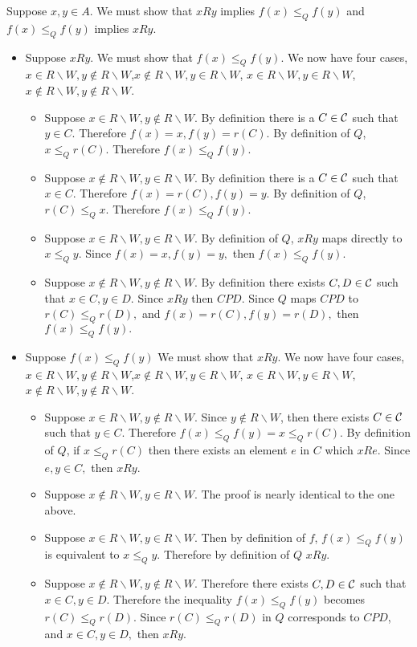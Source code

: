\documentclass[12pt, letterpaper]{article}
\begin{document}
\begin{itemize}
Suppose $x,y \in A.$  We must show that $xRy$ implies $f(x) \leq_Q f(y)$ and $f(x) \leq_Q f(y)$ implies $xRy.$
  \begin{itemize}
  	\item Suppose $xRy$. We must show that $f(x) \leq_Q f(y).$  We now have four cases, $x \in R \backslash W, y \not\in R \backslash W$,$x \not\in R \backslash W, y \in R \backslash W$, $x \in R \backslash W, y \in R \backslash W$, $x \not\in R \backslash W, y \not\in R \backslash W$.
  	\begin{itemize}
  		\item Suppose $x \in R \backslash W, y \not\in R \backslash W$.  By definition there is a $C \in \cal C$ such that $y \in C.$  Therefore $f(x) = x, f(y) = r(C).$  By definition of $Q$, $x \leq_Q r(C).$  Therefore $f(x) \leq_Q f(y).$
  		\item Suppose $x \not\in R \backslash W, y \in R \backslash W$.  By definition there is a $C \in \cal C$ such that $x \in C.$  Therefore $f(x) = r(C), f(y) = y.$  By definition of $Q$, $r(C) \leq_Q x.$  Therefore $f(x) \leq_Q f(y).$
  		\item Suppose $x \in R \backslash W, y \in R \backslash W$.  By definition of $Q$, $xRy$ maps directly to $x \leq_Q y.$  Since $f(x) = x, f(y) = y,$ then $f(x) \leq_Q f(y).$
  		\item Suppose $x \not\in R \backslash W, y \not\in R \backslash W$.  By definition there exists $C,D \in \cal C$ such that $x \in C, y \in D.$  Since $xRy$ then $CPD$.  Since $Q$ maps $CPD$ to $r(C) \leq_Q r(D),$ and $f(x) = r(C), f(y) = r(D),$ then $f(x) \leq_Q f(y).$
  	\end{itemize}
  	\item Suppose $f(x) \leq_Q f(y)$  We must show that $xRy.$ We now have four cases, $x \in R \backslash W, y \not\in R \backslash W$,$x \not\in R \backslash W, y \in R \backslash W$, $x \in R \backslash W, y \in R \backslash W$, $x \not\in R \backslash W, y \not\in R \backslash W$.
  	\begin{itemize}
  		\item Suppose $x \in R \backslash W, y \not\in R \backslash W$. Since $y \not\in R \backslash W$, then there exists $C \in \cal C$ such that $y \in C.$  Therefore $f(x) \leq_Q f(y) = x \leq_Q r(C).$  By definition of $Q$, if $ x \leq_Q r(C)$ then there exists an element $e$ in $C$ which $x R e.$  Since $e,y \in C,$ then $x Ry.$
  		\item Suppose $x \not\in R \backslash W, y \in R \backslash W$.  The proof is nearly identical to the one above.
  		\item Suppose $x \in R \backslash W, y \in R \backslash W$.  Then by definition of $f$, $f(x) \leq_Q f(y)$ is equivalent to $x \leq_Q y.$  Therefore by definition of $Q$ $xRy.$
  		\item Suppose  $x \not\in R \backslash W, y \not\in R \backslash W$.  Therefore there exists $C,D \in \cal C$ such that $x \in C, y \in D.$  Therefore the inequality $f(x) \leq_Q f(y)$ becomes $r(C) \leq_Q r(D).$  Since $r(C) \leq_Q r(D)$ in $Q$ corresponds to $CPD$, and $x \in C, y \in D,$ then $xRy.$
  	\end{itemize}
\end{itemize}   
  	
	\end{itemize}
\end{document}
